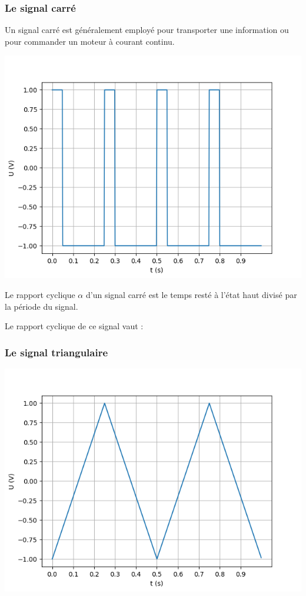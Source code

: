 \documentclass[10pt,fleqn]{article} %
\begin{document}
    \subsubsection{Le signal carré}
    Un signal carré est généralement employé pour transporter une information ou pour commander un moteur à courant continu. 
    \begin{center}
        \includegraphics[height=0.3\textheight]{images/carre.png}
    \end{center}
    
    \begin{defi}
        Le rapport cyclique $\alpha$ d'un signal carré est le temps resté à l'état haut divisé par la période du signal. 
    \end{defi}
    
    \begin{exemple}
        Le rapport cyclique de ce signal vaut : 
    \end{exemple}
    
    
    \subsubsection{Le signal triangulaire}
    \begin{center}
        \includegraphics[height=0.3\textheight]{images/triangle.png}
    \end{center}
    
\end{document}
